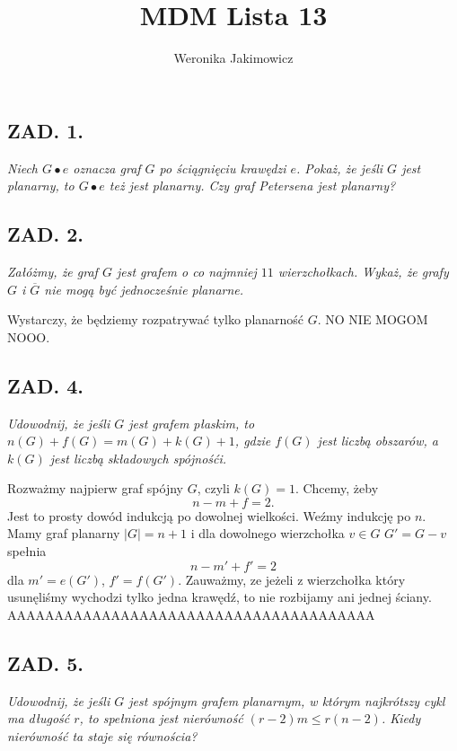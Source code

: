 \documentclass{article}
\author{Weronika Jakimowicz}
\title{MDM Lista 13}
\date{}
\begin{document}
\maketitle
\thispagestyle{empty}

\subsection*{ZAD. 1.}
\emph{Niech $G\bullet e$ oznacza graf $G$ po ściągnięciu krawędzi $e$. Pokaż, że jeśli $G$ jest planarny, to $G\bullet e$ też jest planarny. Czy graf Petersena jest planarny?}
\medskip

\medskip

\subsection*{ZAD. 2.}
\emph{Załóżmy, że graf $G$ jest grafem o co najmniej $11$ wierzchołkach. Wykaż, że grafy $G$ i $\overline G$ nie mogą być jednocześnie planarne.}
\medskip

\medskip

Wystarczy, że będziemy rozpatrywać tylko planarność $G$. NO NIE MOGOM NOOO.

\subsection*{ZAD. 4.}
\emph{Udowodnij, że jeśli $G$ jest grafem płaskim, to $n(G)+f(G)=m(G)+k(G)+1$, gdzie $f(G)$ jest liczbą obszarów, a $k(G)$ jest liczbą składowych spójnośći.}
\medskip

\medskip

Rozważmy najpierw graf spójny $G$, czyli $k(G)=1$. Chcemy, żeby
$$n-m+f=2.$$
Jest to prosty dowód indukcją po dowolnej wielkości. Weźmy indukcję po $n$. Mamy graf planarny $|G|=n+1$ i dla dowolnego wierzchołka $v\in G$ $G'=G-v$ spełnia
$$n-m'+f'=2$$
dla $m'=e(G')$, $f'=f(G')$. Zauważmy, ze jeżeli z wierzchołka który usunęliśmy wychodzi tylko jedna krawędź, to nie rozbijamy ani jednej ściany. AAAAAAAAAAAAAAAAAAAAAAAAAAAAAAAAAAAAAAA

\subsection*{ZAD. 5.}
\emph{Udowodnij, że jeśli $G$ jest spójnym grafem planarnym, w którym najkrótszy cykl ma długość $r$, to spełniona jest nierówność $(r-2)m\leq r(n-2)$. Kiedy nierówność ta staje się równościa?}
\medskip
\end{document}
